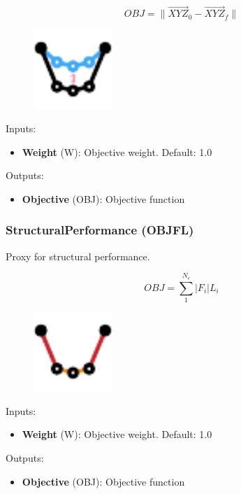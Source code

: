 $$
OBJ = \lVert \vec{XYZ}_0 - \vec{XYZ}_f \rVert
$$

\begin{figure}[h]
    \centering
    \includegraphics[width=3cm]{Figures/Target}
\end{figure}

Inputs:
\begin{itemize}
    \setlength\itemsep{0.05em}
    \item \textbf{Weight} (W): Objective weight. {\color{gray} Default: 1.0}
\end{itemize}

Outputs:
\begin{itemize}
    \setlength\itemsep{0.05em}
    \item \textbf{Objective} (OBJ): Objective function
\end{itemize}

\subsubsection{StructuralPerformance (OBJFL)} \label{OBJFL}
Proxy for structural performance.

$$
OBJ = \sum_1^{N_e} |F_i|L_i
$$

\begin{figure}[h]
    \centering
    \includegraphics[width=3cm]{Figures/performance}
\end{figure}

Inputs:
\begin{itemize}
    \setlength\itemsep{0.05em}
    \item \textbf{Weight} (W): Objective weight. {\color{gray} Default: 1.0}
\end{itemize}

Outputs:
\begin{itemize}
    \setlength\itemsep{0.05em}
    \item \textbf{Objective} (OBJ): Objective function
\end{itemize}

